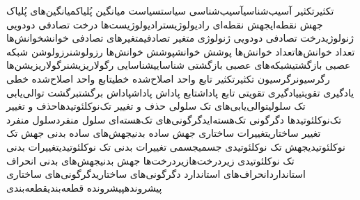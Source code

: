 {تکثیر}{تکثیر}
{آسیب‌شناسی}{آسیب‌شناسی}
{سیاست}{سیاست}
{میانگین پُلیاک}{میانگین‌های پُلیاک}
{جهش نقطه‌ای}{جهش نقطه‌ای}
{رادیولوژیست}{رادیولوژیست‌ها}
{درخت تصادفی دودویی ژنولوژی}{درخت تصادفی دودویی ژنولوژی}
{متغیر تصادفی}{متغیرهای تصادفی}
{خوانش}{خوانش‌ها}
{تعداد خوانش‌ها}{تعداد خوانش‌ها}
{پوشش خوانش}{پوشش خوانش‌ها}
{رزولوشن}{رزولوشن}
{شبکه‌ عصبی بازگشتی}{شبکه‌های عصبی بازگشتی}
{شناسایی}{شناسایی}
{رگولاریزیشن}{رگولاریزیشن‌ها}
{رگرسیون}{رگرسیون}
{تکثیر}{تکثیر}
{تابع واحد اصلاح‌شده خطی}{تابع واحد اصلاح‌شده خطی}
{یادگیری تقویتی}{یادگیری تقویتی}
{تابع پاداش}{تابع پاداش}
{پاداش}{پاداش}
{برگشت}{برگشت}
{توالی‌یابی تک سلولی}{توالی‌یابی‌های تک سلولی}
{حذف و تغییر تک‌نوکلئوتیدها}{حذف و تغییر تک‌نوکلئوتیدها}
{دگرگونی تک‌هسته‌ای}{دگرگونی‌های تک‌هسته‌ای}
{سلول منفرد}{سلول منفرد}
{تغییر ساختاری}{تغییرات ساختاری}
{جهش ساده بدنی}{جهش‌های ساده بدنی}
{جهش تک نوکلئوتیدی}{جهش تک نوکلئوتیدی}
{جسمی}{جسمی}
{تغییرات بدنی تک نوکلئوتیدی}{تغییرات بدنی تک نوکلئوتیدی}
{زیردرخت‌ها}{زیردرخت‌ها}
{جهش بدنی}{جهش‌های بدنی}
{انحراف استاندارد}{انحراف‌های استاندارد}
{دگرگونی‌های ساختاری}{دگرگونی‌های ساختاری}
{پیشرونده}{پیشرونده}
{قطعه‌‌بندی}{قطعه‌بندی}
